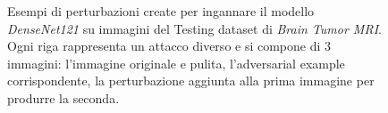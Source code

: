 \begin{figure}[!h]
            \quad
            \quad
            \quad
            
            \caption{Esempi di perturbazioni create per ingannare il modello \textit{DenseNet121} su immagini del Testing dataset di \textit{Brain Tumor MRI}. Ogni riga rappresenta un attacco diverso e si compone di 3 immagini: l'immagine originale e pulita, l'adversarial example corrispondente, la perturbazione aggiunta alla prima immagine per produrre la seconda.}
            \label{Attacks Examples Brain Tumor MRI}
        \end{figure}
